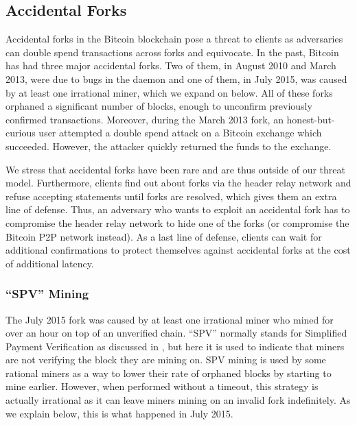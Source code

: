 \subsection{Accidental Forks}
\label{sec:attacks:accidental-forks}
Accidental forks in the Bitcoin blockchain pose a threat to \Sys clients as adversaries can double spend \Sys transactions across forks and equivocate.
In the past, Bitcoin has had three major accidental forks. 
Two of them, in August 2010 and March 2013, were due to bugs in the \bitcoind daemon\cite{august2010fork, march2013fork} and one of them, in July 2015, was caused by at least one irrational miner\cite{july2015fork}, which we expand on below.
All of these forks orphaned a significant number of blocks, enough to unconfirm previously confirmed transactions.
Moreover, during the March 2013 fork\cite{march2013fork}, an honest-but-curious user attempted a double spend attack on a Bitcoin exchange which succeeded. 
However, the attacker quickly returned the funds to the exchange\cite{doublespend-march2013}.

We stress that accidental forks have been rare and are thus outside of our threat model.
Furthermore, clients find out about forks via the header relay network and refuse accepting statements until forks are resolved, which gives them an extra line of defense.
Thus, an adversary who wants to exploit an accidental fork has to compromise the header relay network to hide one of the forks (or compromise the Bitcoin P2P network instead).
As a last line of defense, \Sys clients can wait for additional confirmations to protect themselves against accidental forks at the cost of additional latency.

\subsubsection{``SPV'' Mining}
The July 2015 fork was caused by at least one irrational miner who mined for over an hour on top of an unverified chain\cite{july2015fork-hashes}.
``SPV'' normally stands for Simplified Payment Verification as discussed in , but here it is used to indicate that miners are not verifying the block they are mining on.
SPV mining is used by some rational miners as a way to lower their rate of orphaned blocks by starting to mine earlier\cite{consensuscomputer}.
However, when performed without a timeout, this strategy is actually irrational as it can leave miners mining on an invalid fork indefinitely.
As we explain below, this is what happened in July 2015.

